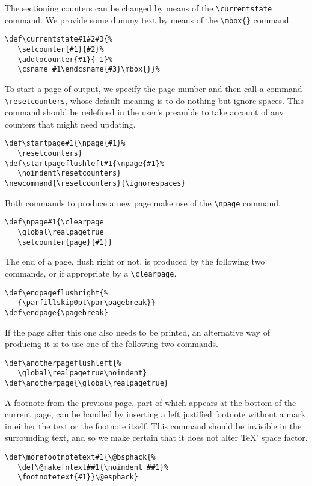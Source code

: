 The sectioning counters can be changed by means of the \verb"\currentstate"
command. We provide some dummy text by means of the
\verb"\mbox{}" command.
\begin{verbatim}
\def\currentstate#1#2#3{%
   \setcounter{#1}{#2}%
   \addtocounter{#1}{-1}%
   \csname #1\endcsname{#3}\mbox{}}%
\end{verbatim}

To start  a page of output, we specify the page number and then call a
command \verb"\resetcounters", whose default meaning is to do
nothing but ignore spaces.
This command should be redefined in the user's
preamble to take account of any counters that might
need updating.
\begin{verbatim}
\def\startpage#1{\npage{#1}%
   \resetcounters}
\def\startpageflushleft#1{\npage{#1}%
   \noindent\resetcounters}
\newcommand{\resetcounters}{\ignorespaces}
\end{verbatim}

Both commands to produce a new page make use of the \verb"\npage" command.
\begin{verbatim}
\def\npage#1{\clearpage
   \global\realpagetrue
   \setcounter{page}{#1}}
\end{verbatim}

The end of a page, flush right or not, is produced by the following two
commands, or if appropriate by a \verb"\clearpage".
\begin{verbatim}
\def\endpageflushright{%
   {\parfillskip0pt\par\pagebreak}}
\def\endpage{\pagebreak}
\end{verbatim}
If the page after this one also needs to be printed, an alternative way
of producing it is to use one of the following two commands.
\begin{verbatim}
\def\anotherpageflushleft{%
   \global\realpagetrue\noindent}
\def\anotherpage{\global\realpagetrue}
\end{verbatim}

A footnote from the previous page, part of which appears at the bottom of
the current page, can be handled by inserting a left justified
footnote without a mark in either the text or the footnote itself.
This command should be invisible in the surrounding text, and so we make
certain that it does not alter \TeX' space factor.
\begin{verbatim}
\def\morefootnotetext#1{\@bsphack{%
   \def\@makefntext##1{\noindent ##1}%
   \footnotetext{#1}}\@esphack}
\end{verbatim}

